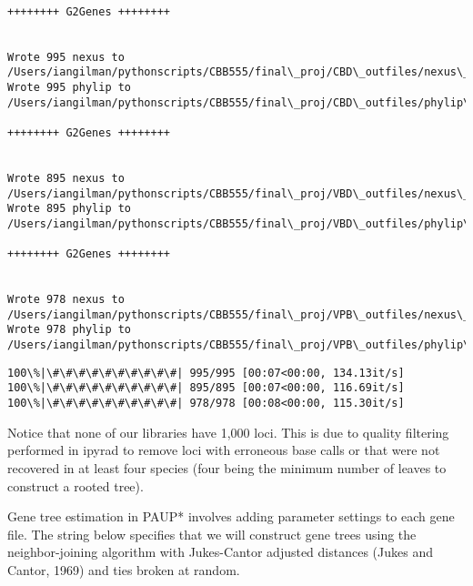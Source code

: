\documentclass[11pt]{article}
\begin{document}
    \begin{Verbatim}[commandchars=\\\{\},fontsize=\footnotesize]

++++++++ G2Genes ++++++++


Wrote 995 nexus to
/Users/iangilman/pythonscripts/CBB555/final\_proj/CBD\_outfiles/nexus\_gfiles
Wrote 995 phylip to
/Users/iangilman/pythonscripts/CBB555/final\_proj/CBD\_outfiles/phylip\_gfiles

++++++++ G2Genes ++++++++


Wrote 895 nexus to
/Users/iangilman/pythonscripts/CBB555/final\_proj/VBD\_outfiles/nexus\_gfiles
Wrote 895 phylip to
/Users/iangilman/pythonscripts/CBB555/final\_proj/VBD\_outfiles/phylip\_gfiles

++++++++ G2Genes ++++++++


Wrote 978 nexus to
/Users/iangilman/pythonscripts/CBB555/final\_proj/VPB\_outfiles/nexus\_gfiles
Wrote 978 phylip to
/Users/iangilman/pythonscripts/CBB555/final\_proj/VPB\_outfiles/phylip\_gfiles

    \end{Verbatim}

    \begin{Verbatim}[commandchars=\\\{\},fontsize=\footnotesize]
100\%|\#\#\#\#\#\#\#\#\#\#| 995/995 [00:07<00:00, 134.13it/s]
100\%|\#\#\#\#\#\#\#\#\#\#| 895/895 [00:07<00:00, 116.69it/s]
100\%|\#\#\#\#\#\#\#\#\#\#| 978/978 [00:08<00:00, 115.30it/s]

    \end{Verbatim}

    Notice that none of our libraries have 1,000 loci. This is due to
quality filtering performed in ipyrad to remove loci with erroneous base
calls or that were not recovered in at least four species (four being
the minimum number of leaves to construct a rooted tree).

Gene tree estimation in PAUP* involves adding parameter settings to each
gene file. The string below specifies that we will construct gene trees
using the neighbor-joining algorithm with Jukes-Cantor adjusted
distances (Jukes and Cantor, 1969) and ties broken at random.
\end{document}
